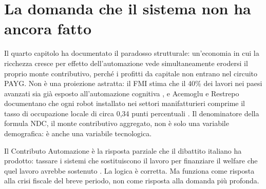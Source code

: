 
\section*{La domanda che il sistema non ha ancora fatto}

\noindent
Il quarto capitolo ha documentato il paradosso strutturale: un'economia
in cui la ricchezza cresce per effetto dell'automazione vede simultaneamente
erodersi il proprio monte contributivo, perché i profitti da capitale non
entrano nel circuito PAYG.
Non è una proiezione astratta: il FMI stima che il 40\% dei lavori nei
paesi avanzati sia già esposto all'automazione cognitiva \cite{IMF2024},
e Acemoglu e Restrepo documentano che ogni robot installato nei settori
manifatturieri comprime il tasso di occupazione locale di circa 0,34
punti percentuali \cite{AcemogluRestrepo2020}.
Il denominatore della formula NDC, il monte contributivo aggregato, non
è solo una variabile demografica: è anche una variabile tecnologica.

Il Contributo Automazione è la risposta parziale che il dibattito italiano
ha prodotto: tassare i sistemi che sostituiscono il lavoro per finanziare
il welfare che quel lavoro avrebbe sostenuto \cite{Bacchiocchi2025}.
La logica è corretta. Ma funziona come risposta alla crisi fiscale del
breve periodo, non come risposta alla domanda più profonda.

